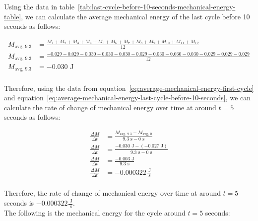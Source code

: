 \documentclass{article}
\begin{document}
            Using the data in table~\ref{tab:last-cycle-before-10-seconds-mechanical-energy-table}, we can calculate the average mechanical energy of the last cycle before 10 seconds as follows:
            
            \begin{equation}
                \begin{aligned}
                    M_{\text{avg, 9.3}} &= \frac{M_1 + M_2 + M_3 + M_4 + M_5 + M_6 + M_7 + M_8 + M_9 + M_{10} + M_{11} + M_{12}}{12} \\
                    M_{\text{avg, 9.3}} &= \frac{-0.029 -0.029 -0.030 -0.030 -0.030 -0.029 -0.030 -0.030 -0.030 -0.029 -0.029 -0.029}{12} \\
                    M_{\text{avg, 9.3}} &= -0.030 \text{ J} \\
                \end{aligned}\label{eq:average-mechanical-energy-last-cycle-before-10-seconds}
            \end{equation}
            
            Therefore, using the data from equation~\ref{eq:average-mechanical-energy-first-cycle} and equation~\ref{eq:average-mechanical-energy-last-cycle-before-10-seconds}, we can calculate the rate of change of mechanical energy over time at around $t = 5$ seconds as follows:
            
            \begin{equation}
                \begin{aligned}
                    \frac{\Delta M}{\Delta t} &= \frac{M_{\text{avg, 9.3}} - M_{\text{avg, 0}}}{9.3 \text{ s} - 0 \text{ s}} \\
                    \frac{\Delta M}{\Delta t} &= \frac{-0.030 \text{ J} - (-0.027 \text{ J})}{9.3 \text{ s} - 0 \text{ s}} \\
                    \frac{\Delta M}{\Delta t} &= \frac{-0.003 \text{ J}}{9.3 \text{ s}} \\
                    \frac{\Delta M}{\Delta t} &= -0.000322 \frac{\text{ J}}{\text{ s}} \\
                \end{aligned}\label{eq:rate-of-change-of-mechanical-energy-over-time}
            \end{equation}
            
            Therefore, the rate of change of mechanical energy over time at around $t = 5$ seconds is $-0.000322 \frac{\text{ J}}{\text{ s}}$. \\
            \newline \indent The following is the mechanical energy for the cycle around $t=5$ seconds:
            
\end{document}
